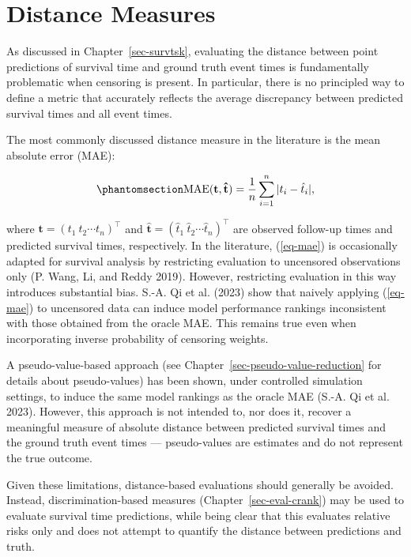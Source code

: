 \documentclass[
  letterpaper,
  krantz2]{style/krantz}
\begin{document}
\chapter{Distance Measures}\label{sec-eval-det}

As discussed in Chapter~\ref{sec-survtsk}, evaluating the distance
between point predictions of survival time and ground truth event times
is fundamentally problematic when censoring is
present. In particular, there is no principled way
to define a metric that accurately reflects the average discrepancy
between predicted survival times and all event times.

The most commonly discussed distance measure in the literature is the
mean absolute error (MAE):

\begin{equation}\phantomsection\label{eq-mae}{
\operatorname{MAE}(\mathbf{t}, \mathbf{\hat{t}}) = \frac{1}{n} \sum^{n}_{i = 1} \vert t_i - \hat{t}_i \vert,
}\end{equation}

where \(\boldsymbol{\mathbf{t}} = ({t}_1 \ {t}_2 \cdots {t}_{n})^\top\)
and
\(\boldsymbol{\mathbf{\hat{t}}} = ({\hat{t}}_1 \ {\hat{t}}_2 \cdots {\hat{t}}_{n})^\top\)
are observed follow-up times and predicted survival times, respectively.
In the literature, (\ref{eq-mae}) is occasionally adapted for survival
analysis by restricting evaluation to uncensored observations only (P.
Wang, Li, and Reddy 2019). However, restricting evaluation in this way
introduces substantial bias. S.-A. Qi et al. (2023) show that naively
applying (\ref{eq-mae}) to uncensored data can induce model performance
rankings inconsistent with those obtained from the oracle MAE. This
remains true even when incorporating inverse probability of censoring
weights.

A pseudo-value-based approach (see
Chapter~\ref{sec-pseudo-value-reduction} for details about
pseudo-values) has been shown, under controlled simulation settings, to
induce the same model rankings as the oracle MAE (S.-A. Qi et al. 2023).
However, this approach is not intended to, nor does it, recover a
meaningful measure of absolute distance between predicted survival times
and the ground truth event times --- pseudo-values are estimates and do
not represent the true outcome.

Given these limitations, distance-based evaluations should generally be
avoided. Instead, discrimination-based measures
(Chapter~\ref{sec-eval-crank}) may be used to evaluate survival time
predictions, while being clear that this evaluates relative risks only
and does not attempt to quantify the distance between predictions and
truth.
\end{document}
